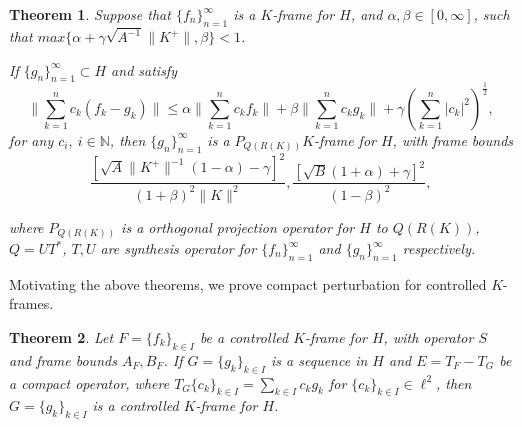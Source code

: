 \documentclass[11pt]{amsart}
\newtheorem{thm}{Theorem}[section]
\theoremstyle{definition}
\theoremstyle{remark}
\numberwithin{equation}{section}
\begin{document}
\begin{thm} \cite{12}
Suppose that $\{f_n\}_{n=1}^\infty$ is a $K$-frame for $H$, and $\alpha,\beta\in[0,\infty]$, such that $max\{\alpha+\gamma\sqrt{A^{-1}}\|K^+\|,\beta\}<1$.

If $\{g_n\}_{n=1}^\infty\subset H$ and satisfy
\[\|\sum_{k=1}^{n}c_k(f_k-g_k)\|\le\alpha\|\sum_{k=1}^{n}c_kf_k\|+ \beta\|\sum_{k=1}^{n}c_kg_k\|+\gamma(\sum_{k=1}^{n}|c_k|^2)^{\frac{1}{2}},\]
for any $c_i,\ i\in{\mathbb N}$, then $\{g_n\}_{n=1}^\infty$ is a $P_{Q(R(K))}K$-frame for $H$, with frame bounds
\[\dfrac{[\sqrt{A}\|K^+\|^{-1}(1-\alpha)-\gamma]^2}{(1+\beta)^2\|K\|^2} , \dfrac{[\sqrt{B}(1+\alpha)+\gamma]^2}{(1-\beta)^2},\]

where $P_{Q(R(K))}$ is a orthogonal projection operator for $H$ to $Q(R(K))$, $Q=UT^*$, $T,U$ are synthesis operator for $\{f_n\}_{n=1}^\infty$ and $\{g_n\}_{n=1}^\infty$ respectively.
\end{thm}
Motivating the above theorems, we prove compact perturbation for controlled $K$-frames.
\begin{thm}
Let $F=\{f_k\}_{k\in I}$ be a controlled $K$-frame for $H$, with operator $S$ and frame bounds $A_F,B_F$.
If $G=\{g_k\}_{k\in I}$ is a sequence  in $H$ and $E=T_F-T_G$ be a compact operator, where $T_G\{c_k\}_{k\in I}=\sum_{k\in I}c_k g_k$ for $\{c_k\}_{k\in I}\in\ell^2 $,  then $G=\{g_k\}_{k\in I}$ is a controlled $K$-frame for $H$.
\end{thm}
\end{document}

